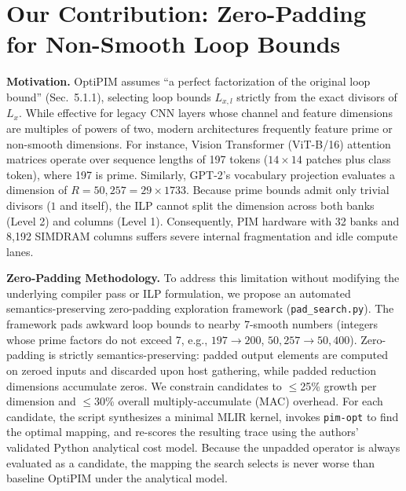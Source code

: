 \documentclass[conference]{IEEEtran}
\begin{document}
\section{Our Contribution: Zero-Padding for Non-Smooth Loop Bounds}
\label{sec:ext}

\textbf{Motivation.}
OptiPIM assumes ``a perfect factorization of the original loop bound'' (Sec.~5.1.1), selecting loop bounds $L_{x,l}$ strictly from the exact divisors of $L_x$.
While effective for legacy CNN layers whose channel and feature dimensions are multiples of powers of two, modern architectures frequently feature prime or non-smooth dimensions.
For instance, Vision Transformer (ViT-B/16) attention matrices operate over sequence lengths of 197 tokens ($14\times14$ patches plus class token), where 197 is prime.
Similarly, GPT-2's vocabulary projection evaluates a dimension of $R = 50{,}257 = 29 \times 1733$.
Because prime bounds admit only trivial divisors ($1$ and itself), the ILP cannot split the dimension across both banks (Level 2) and columns (Level 1).
Consequently, PIM hardware with 32 banks and 8{,}192 SIMDRAM columns suffers severe internal fragmentation and idle compute lanes.

\textbf{Zero-Padding Methodology.}
To address this limitation without modifying the underlying compiler pass or ILP formulation, we propose an automated semantics-preserving zero-padding exploration framework (\texttt{pad\_search.py}).
The framework pads awkward loop bounds to nearby 7-smooth numbers (integers whose prime factors do not exceed 7, e.g., $197 \to 200$, $50{,}257 \to 50{,}400$).
Zero-padding is strictly semantics-preserving: padded output elements are computed on zeroed inputs and discarded upon host gathering, while padded reduction dimensions accumulate zeros.
We constrain candidates to $\le$25\% growth per dimension and $\le$30\% overall multiply-accumulate (MAC) overhead.
For each candidate, the script synthesizes a minimal MLIR kernel, invokes \texttt{pim-opt} to find the optimal mapping, and re-scores the resulting trace using the authors' validated Python analytical cost model.
Because the unpadded operator is always evaluated as a candidate, the mapping the search selects is never worse than baseline OptiPIM under the analytical model.
\end{document}
